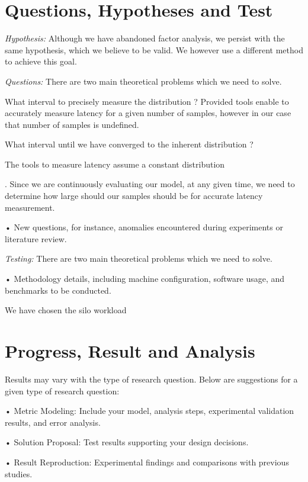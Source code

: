 \documentclass[12pt]{article}
\begin{document}
\section{Questions, Hypotheses and Test}

\textit{Hypothesis:} Although we have abandoned factor analysis, we persist with the same hypothesis, which we believe to be valid. We however use a different method to achieve this goal.

\singlespacing

\noindent \textit{Questions:} There are two main theoretical problems which we need to solve.

\singlespacing 

What interval to precisely measure the distribution ? Provided tools enable to accurately measure latency for a given number of samples, however in our case that number of samples is undefined.


What interval until we have converged to the inherent distribution ?

The tools to measure latency assume a constant distribution

. Since we are continuously evaluating our model, at any given time, we need to determine how large should our samples should be for accurate latency measurement.

• New questions, for instance, anomalies encountered during experiments or literature review.
\singlespacing

\noindent \textit{Testing:} There are two main theoretical problems which we need to solve.

• Methodology details, including machine configuration, software usage, and benchmarks to be conducted.

We have chosen the silo workload

\section{Progress, Result and Analysis}

Results may vary with the type of research question. Below are suggestions for a given type of research question:

• Metric Modeling: Include your model, analysis steps, experimental validation results, and error analysis.

• Solution Proposal: Test results supporting your design decisions.

• Result Reproduction: Experimental findings and comparisons with previous studies.
\end{document}
